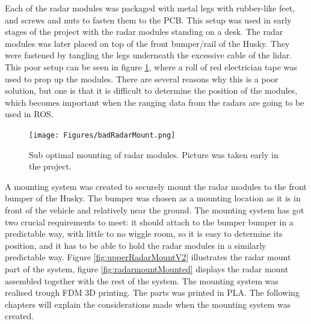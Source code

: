 Each of the radar modules was packaged with metal legs with rubber-like feet, and screws and nuts to fasten them to the PCB. This setup was used in early stages of the project with the radar modules standing on a desk. The radar modules was later placed on top of the front bumper/rail of the Husky. They were fastened by tangling the legs underneath the excessive cable of the lidar. This poor setup can be seen in figure \ref{fig:badRadarMount}, where a roll of red electrician tape was used to prop up the modules. There are several reasons why this is a poor solution, but one is that it is difficult to determine the position of the modules, which becomes important when the ranging data from the radars are going to be used in ROS. 

\begin{figure}[H]
    \centering
    \texttt{[image: Figures/badRadarMount.png]}
    \caption{Sub optimal mounting of radar modules. Picture was taken early in the project.}
    \label{fig:badRadarMount}
\end{figure}

A mounting system was created to securely mount the radar modules to the front bumper of the Husky. The bumper was chosen as a mounting location as it is in front of the vehicle and relatively near the ground. The mounting system has got two crucial requirements to meet: it should attach to the bumper bumper in a predictable way, with little to no wiggle room, so it is easy to determine its position, and it has to be able to hold the radar modules in a similarly predictable way. Figure \ref{fig:upperRadarMountV2} illustrates the radar mount part of the system, figure \ref{fig:radarmountMounted} displays the radar mount assembled together with the rest of the system. The mounting system was realised trough FDM 3D printing. The parts was printed in PLA. The following chapters will explain the considerations made when the mounting system was created. 


